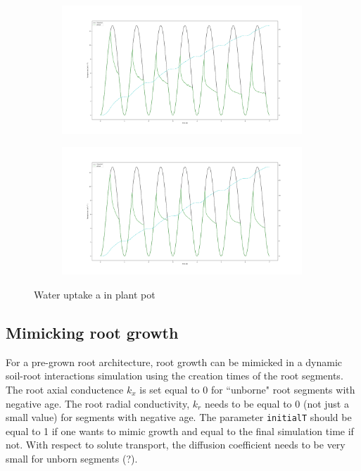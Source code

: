 \begin{figure}
\begin{subfigure}[c]{1\textwidth}
\includegraphics[width=0.99\textwidth]{example7c_no_hydro.png}
 \label{fig:example7c}
\end{subfigure}
\begin{subfigure}[c]{1\textwidth}
\includegraphics[width=0.99\textwidth]{example7c_simple_hydro.png}
 \label{fig:example7c_hydro}
\end{subfigure}
\caption{Water uptake a in plant pot} \label{fig:example7c}
\end{figure}

\subsection{Mimicking root growth}
For a pre-grown root architecture, root growth can be mimicked in a dynamic soil-root interactions simulation using the creation times of the root segments. The root axial conductence $k_x$ is set equal to 0 for ``unborne" root segments with negative age. The root radial conductivity, $k_r$ needs to be equal to 0 (not just a small value) for segments with negative  age. 
The parameter \lstinline{initialT} should be equal to 1 if one wants to mimic growth and equal to the final simulation time if not. 
With respect to solute transport, the diffusion coefficient needs to be very small  for unborn segments (?).

